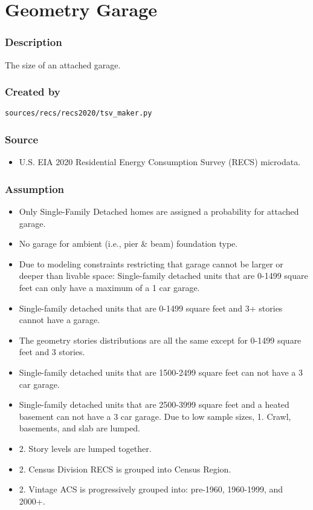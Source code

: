 \section{Geometry Garage}\label{geometry_garage}

\subsubsection{Description}\label{description-55}

The size of an attached garage.

\subsubsection{Created by}\label{created-by-55}

\texttt{sources/recs/recs2020/tsv\_maker.py}

\subsubsection{Source}\label{source-54}

\begin{itemize}
 
\item
  U.S. EIA 2020 Residential Energy Consumption Survey (RECS) microdata.
\end{itemize}

\subsubsection{Assumption}\label{assumption-29}

\begin{itemize}
 
\item
  Only Single-Family Detached homes are assigned a probability for
  attached garage.
\item
  No garage for ambient (i.e., pier \& beam) foundation type.
\item
  Due to modeling constraints restricting that garage cannot be larger
  or deeper than livable space: Single-family detached units that are
  0-1499 square feet can only have a maximum of a 1 car garage.
\item
  Single-family detached units that are 0-1499 square feet and 3+
  stories cannot have a garage.
\item
  The geometry stories distributions are all the same except for 0-1499
  square feet and 3 stories.
\item
  Single-family detached units that are 1500-2499 square feet can not
  have a 3 car garage.
\item
  Single-family detached units that are 2500-3999 square feet and a
  heated basement can not have a 3 car garage. Due to low sample sizes,
  1. Crawl, basements, and slab are lumped.
\item
  2. Story levels are lumped together.
\item
  2. Census Division RECS is grouped into Census Region.
\item
  2. Vintage ACS is progressively grouped into: pre-1960, 1960-1999, and
  2000+.
\end{itemize}

